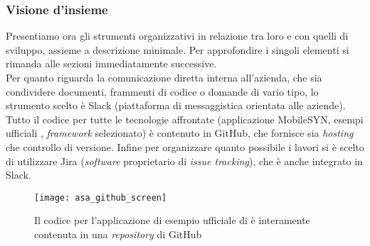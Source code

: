 \subsubsection{Visione d'insieme}
Presentiamo ora gli strumenti organizzativi in relazione tra loro e con quelli di sviluppo, assieme a descrizione minimale. Per approfondire i singoli elementi si rimanda alle sezioni immediatamente successive.\\
Per quanto riguarda la comunicazione diretta interna all'azienda, che sia condividere documenti, frammenti di codice o domande di vario tipo, lo strumento scelto è Slack (piattaforma di messaggistica orientata alle aziende).\\
Tutto il codice per tutte le tecnologie affrontate (applicazione MobileSYN, esempi ufficiali \asa{}, \textit{framework} selezionato) è contenuto in GitHub, che fornisce sia \textit{hosting} che controllo di versione. Infine per organizzare quanto possibile i lavori si è scelto di utilizzare Jira (\textit{software} proprietario di \textit{issue tracking}), che è anche integrato in Slack.\\
\begin{figure}[H]
    \centering
    \texttt{[image: asa\_github\_screen]}
    \caption[\textit{Repository} per esempio \asa{}]{Il codice per l'applicazione di esempio ufficiale di \asa{} è interamente contenuta in una \textit{repository} di GitHub\footnotemark}
\end{figure}

